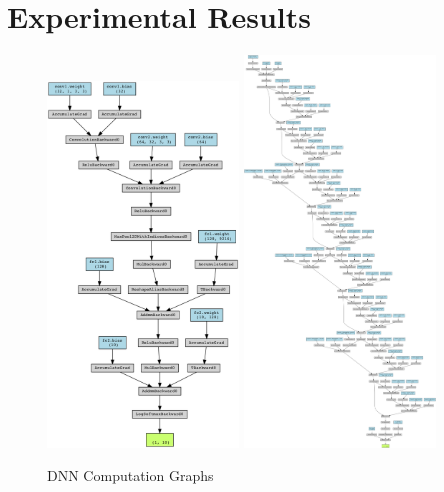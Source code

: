 \documentclass{article}
\begin{document}
\section{Experimental Results}

\begin{figure}
    \centerline{
        \includegraphics[width=2in]{../proj1/figures/mnist_cnn.png}
        \includegraphics[width=2in]{../proj1/figures/resnet18.png}
    }
    \caption{DNN Computation Graphs}
    \label{fig:dnngraph}
\end{figure}
\end{document}

